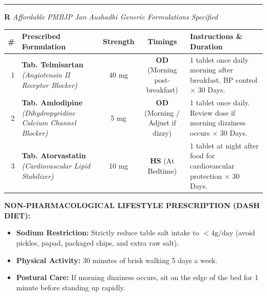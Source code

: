 \documentclass[9pt,a4paper]{article}
\begin{document}
\begin{tcolorbox}[
    colback=white,
    colframe=primary,
    arc=3mm,
    boxrule=1.5pt,
    left=8pt, right=8pt, top=5pt, bottom=5pt
]
\vspace{1pt}
\noindent\textcolor{linegray}{\rule{\linewidth}{0.6pt}}

\vspace{1pt}
{\LARGE\textbf{\color{primary}R}} \hfill {\scriptsize\textit{\color{darktext}Affordable PMBJP Jan Aushadhi Generic Formulations Specified}}

\vspace{1pt}
\begin{tabularx}{\linewidth}{|r|X|c|c|X|}
\hline
\textbf{\#} & \textbf{Prescribed Formulation} & \textbf{Strength} & \textbf{Timings} & \textbf{Instructions \& Duration} \\
\hline
1 & \textbf{Tab. Telmisartan} \newline \textit{(Angiotensin II Receptor Blocker)} & 40 mg & \textbf{OD} (Morning post-breakfast) & 1 tablet once daily morning after breakfast. BP control $\times$ 30 Days. \\
\hline
2 & \textbf{Tab. Amlodipine} \newline \textit{(Dihydropyridine Calcium Channel Blocker)} & 5 mg & \textbf{OD} (Morning / Adjust if dizzy) & 1 tablet once daily. Review dose if morning dizziness occurs $\times$ 30 Days. \\
\hline
3 & \textbf{Tab. Atorvastatin} \newline \textit{(Cardiovascular Lipid Stabilizer)} & 10 mg & \textbf{HS} (At Bedtime) & 1 tablet at night after food for cardiovascular protection $\times$ 30 Days. \\
\hline
\end{tabularx}

\vspace{2pt}
\begin{tcolorbox}[colback=lightgray, colframe=primary!30, arc=2mm, boxrule=0.6pt, left=5pt, right=5pt, top=2pt, bottom=2pt]
    \textbf{\color{primarydark}NON-PHARMACOLOGICAL LIFESTYLE PRESCRIPTION (DASH DIET):}
    \begin{itemize}[leftmargin=12pt, topsep=1pt, itemsep=0pt]
        \item \textbf{Sodium Restriction:} Strictly reduce table salt intake to $< 4\text{g/day}$ (avoid pickles, papad, packaged chips, and extra raw salt).
        \item \textbf{Physical Activity:} 30 minutes of brisk walking 5 days a week.
        \item \textbf{Postural Care:} If morning dizziness occurs, sit on the edge of the bed for 1 minute before standing up rapidly.
    \end{itemize}
\end{tcolorbox}


\end{tcolorbox}
\end{document}
